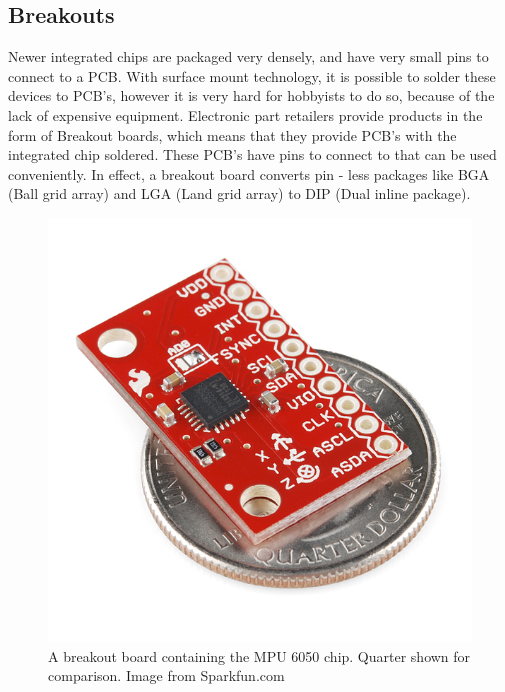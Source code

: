 \subsection{Breakouts}
\label{Sec:Breakouts}
Newer integrated chips are packaged very densely, and have very small pins to connect to a PCB. With surface mount technology, it is possible to solder these devices to PCB's, however it is very hard for hobbyists to do so, because of the lack of expensive equipment. Electronic part retailers provide products in the form of Breakout boards, which means that they provide PCB's with the integrated chip soldered. These PCB's have pins to connect to that can be used conveniently. In effect, a breakout board converts pin - less packages like BGA (Ball grid array) and LGA (Land grid array) to DIP (Dual inline package).
\begin{figure}
\begin{center}
\includegraphics{images/MPUBreakout.jpg}
\caption{A breakout board containing the MPU 6050 chip. Quarter shown for comparison. Image from Sparkfun.com}
\label{Fig:MPUBreakOut}
\end{center}
\end{figure}

